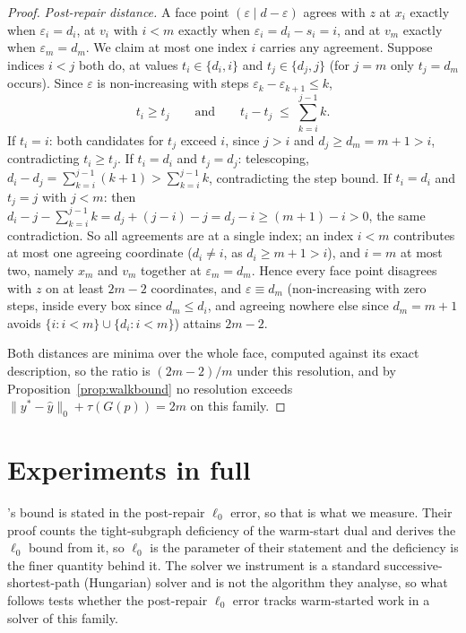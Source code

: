 \begin{proof}
\emph{Post-repair distance.} A face point $(\varepsilon \mid d - \varepsilon)$ agrees
with $z$ at $x_i$ exactly when $\varepsilon_i = d_i$, at $v_i$ with $i < m$ exactly when
$\varepsilon_i = d_i - s_i = i$, and at $v_m$ exactly when $\varepsilon_m = d_m$. We
claim at most one index $i$ carries any agreement. Suppose indices $i < j$ both do, at
values $t_i \in \{d_i, i\}$ and $t_j \in \{d_j, j\}$ (for $j = m$ only $t_j = d_m$
occurs). Since $\varepsilon$ is non-increasing with steps
$\varepsilon_k - \varepsilon_{k+1} \le k$,
\[
  t_i \ge t_j
  \qquad\text{and}\qquad
  t_i - t_j \;\le\; \sum_{k=i}^{j-1} k .
\]
If $t_i = i$: both candidates for $t_j$ exceed $i$, since $j > i$ and
$d_j \ge d_m = m + 1 > i$, contradicting $t_i \ge t_j$. If $t_i = d_i$ and
$t_j = d_j$: telescoping, $d_i - d_j = \sum_{k=i}^{j-1} (k + 1) > \sum_{k=i}^{j-1} k$,
contradicting the step bound. If $t_i = d_i$ and $t_j = j$ with $j < m$: then
$d_i - j - \sum_{k=i}^{j-1} k = d_j + (j - i) - j = d_j - i \ge (m + 1) - i > 0$,
the same contradiction. So all agreements are at a single index; an index $i < m$
contributes at most one agreeing coordinate ($d_i \ne i$, as $d_i \ge m + 1 > i$), and
$i = m$ at most two, namely $x_m$ and $v_m$ together at $\varepsilon_m = d_m$. Hence
every face point disagrees with $z$ on at least $2m - 2$ coordinates, and
$\varepsilon \equiv d_m$ (non-increasing with zero steps, inside every box since
$d_m \le d_i$, and agreeing nowhere else since $d_m = m + 1$ avoids
$\{i : i < m\} \cup \{d_i : i < m\}$) attains $2m - 2$.

Both distances are minima over the whole face, computed against its exact description,
so the ratio is $(2m - 2)/m$ under this resolution, and by
Proposition~\ref{prop:walkbound} no resolution exceeds
$\|y^* - \hat y\|_0 + \tau(G(p)) = 2m$ on this family.
\end{proof}


\section{Experiments in full}\label{app:experiments}

\citeauthor{chen2022}'s bound is stated in the post-repair $\ell_0$ error, so that is what we
measure. Their proof counts the tight-subgraph deficiency of the warm-start dual and derives the $\ell_0$
bound from it, so $\ell_0$ is the parameter of their statement and the deficiency is the finer
quantity behind it. The solver we instrument is a standard successive-shortest-path (Hungarian)
solver and is not the algorithm they analyse, so what follows tests whether the post-repair $\ell_0$
error tracks warm-started work in a solver of this family.

